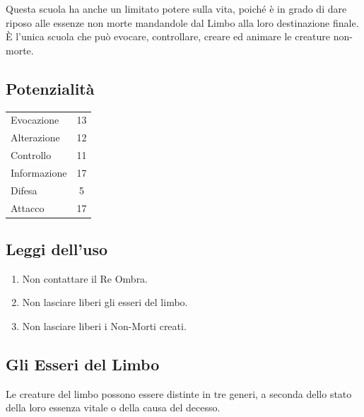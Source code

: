 Questa scuola ha anche un limitato potere sulla vita, poich\'e \`e
in grado di dare riposo alle essenze non morte mandandole dal Limbo
alla loro destinazione finale. \`E l'unica scuola che pu\`o evocare,
controllare, creare ed animare le creature non-morte.

\subsection{Potenzialit\`a}  

\begin{tabular}{lc}
  Evocazione& 13 \\
  Alterazione& 12 \\
  Controllo& 11\\
  Informazione& 17 \\
  Difesa& 5 \\
  Attacco& 17\\
\end{tabular}

\subsection{Leggi dell'uso} 
\begin{enumerate}\itemsep -6pt
\item Non contattare il Re Ombra. 
\item Non lasciare liberi gli esseri del limbo.
\item Non lasciare liberi i Non-Morti creati. 
\end{enumerate}


\subsection{Gli Esseri del Limbo}

 Le creature
del limbo possono essere distinte in tre generi, a seconda dello stato della
loro essenza vitale o della causa del decesso. 

